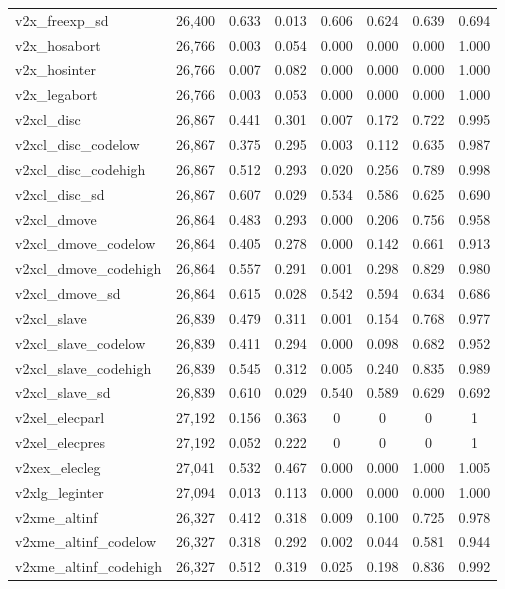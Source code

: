 \begin{table}[!htbp]
\begin{tabular}{@{\extracolsep{5pt}}lccccccc}
v2x\_freexp\_sd & 26,400 & 0.633 & 0.013 & 0.606 & 0.624 & 0.639 & 0.694 \\ 
v2x\_hosabort & 26,766 & 0.003 & 0.054 & 0.000 & 0.000 & 0.000 & 1.000 \\ 
v2x\_hosinter & 26,766 & 0.007 & 0.082 & 0.000 & 0.000 & 0.000 & 1.000 \\ 
v2x\_legabort & 26,766 & 0.003 & 0.053 & 0.000 & 0.000 & 0.000 & 1.000 \\ 
v2xcl\_disc & 26,867 & 0.441 & 0.301 & 0.007 & 0.172 & 0.722 & 0.995 \\ 
v2xcl\_disc\_codelow & 26,867 & 0.375 & 0.295 & 0.003 & 0.112 & 0.635 & 0.987 \\ 
v2xcl\_disc\_codehigh & 26,867 & 0.512 & 0.293 & 0.020 & 0.256 & 0.789 & 0.998 \\ 
v2xcl\_disc\_sd & 26,867 & 0.607 & 0.029 & 0.534 & 0.586 & 0.625 & 0.690 \\ 
v2xcl\_dmove & 26,864 & 0.483 & 0.293 & 0.000 & 0.206 & 0.756 & 0.958 \\ 
v2xcl\_dmove\_codelow & 26,864 & 0.405 & 0.278 & 0.000 & 0.142 & 0.661 & 0.913 \\ 
v2xcl\_dmove\_codehigh & 26,864 & 0.557 & 0.291 & 0.001 & 0.298 & 0.829 & 0.980 \\ 
v2xcl\_dmove\_sd & 26,864 & 0.615 & 0.028 & 0.542 & 0.594 & 0.634 & 0.686 \\ 
v2xcl\_slave & 26,839 & 0.479 & 0.311 & 0.001 & 0.154 & 0.768 & 0.977 \\ 
v2xcl\_slave\_codelow & 26,839 & 0.411 & 0.294 & 0.000 & 0.098 & 0.682 & 0.952 \\ 
v2xcl\_slave\_codehigh & 26,839 & 0.545 & 0.312 & 0.005 & 0.240 & 0.835 & 0.989 \\ 
v2xcl\_slave\_sd & 26,839 & 0.610 & 0.029 & 0.540 & 0.589 & 0.629 & 0.692 \\ 
v2xel\_elecparl & 27,192 & 0.156 & 0.363 & 0 & 0 & 0 & 1 \\ 
v2xel\_elecpres & 27,192 & 0.052 & 0.222 & 0 & 0 & 0 & 1 \\ 
v2xex\_elecleg & 27,041 & 0.532 & 0.467 & 0.000 & 0.000 & 1.000 & 1.005 \\ 
v2xlg\_leginter & 27,094 & 0.013 & 0.113 & 0.000 & 0.000 & 0.000 & 1.000 \\ 
v2xme\_altinf & 26,327 & 0.412 & 0.318 & 0.009 & 0.100 & 0.725 & 0.978 \\ 
v2xme\_altinf\_codelow & 26,327 & 0.318 & 0.292 & 0.002 & 0.044 & 0.581 & 0.944 \\ 
v2xme\_altinf\_codehigh & 26,327 & 0.512 & 0.319 & 0.025 & 0.198 & 0.836 & 0.992 \\ 

\end{tabular}
\end{table}
